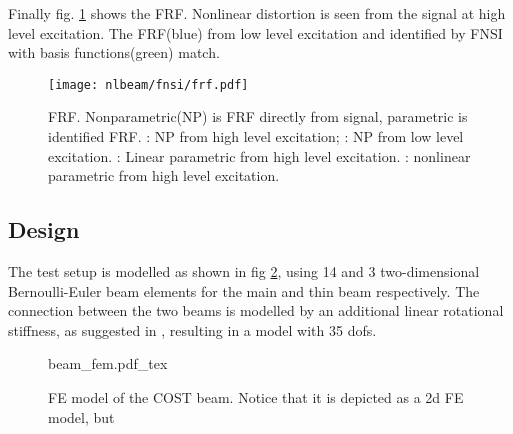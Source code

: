 Finally fig. \ref{fig:nlbeam_frf} shows the FRF. Nonlinear distortion is seen
from the signal at high level excitation. The FRF(blue) from low level excitation and
identified by FNSI with basis functions(green) match.

\begin{figure}[!ht]
  \centering
  \texttt{[image: nlbeam/fnsi/frf.pdf]}
  \caption{FRF. Nonparametric(NP) is FRF directly from signal, parametric is
    identified FRF.
    \sampleline{}: NP from high level excitation;
    \textcolor{blue}{\sampleline{}}: NP from low level excitation.
    \textcolor{orange}{\sampleline{}}: Linear parametric from high level excitation.
    \textcolor{green}{}: nonlinear parametric from high level excitation.
}
  \label{fig:nlbeam_frf}
\end{figure}

\subsection{Design}

The test setup is modelled as shown in fig \ref{fig:nlbeam_fem}, using 14 and 3
two-dimensional Bernoulli-Euler beam elements for the main and thin beam
respectively. The connection between the two beams is modelled by an additional
linear rotational stiffness, as suggested in \autocite{lenaerts2003a}, resulting
in a model with 35 dofs.

\begin{figure}[!ht]
  \centering
  \def\svgwidth{6cm}
  {beam_fem.pdf_tex}
  \caption{FE model of the COST beam. Notice that it is depicted as a 2d FE
    model, but }
  \label{fig:nlbeam_fem}
\end{figure}

